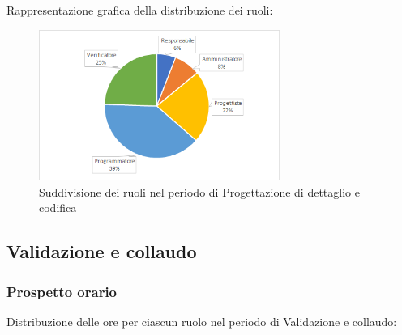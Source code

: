 		Rappresentazione grafica della distribuzione dei ruoli:
		\begin{figure}[h]
			\centering
			\includegraphics[width=0.7\textwidth]{./res/img/progettazioneDettaglioCodifica_pe.png}
			\caption{Suddivisione dei ruoli nel periodo di Progettazione di dettaglio e codifica}
		\end{figure}

\newpage	
\subsection{Validazione e collaudo}
	\subsubsection{Prospetto orario}
	Distribuzione delle ore per ciascun ruolo nel periodo di Validazione e collaudo:
		
